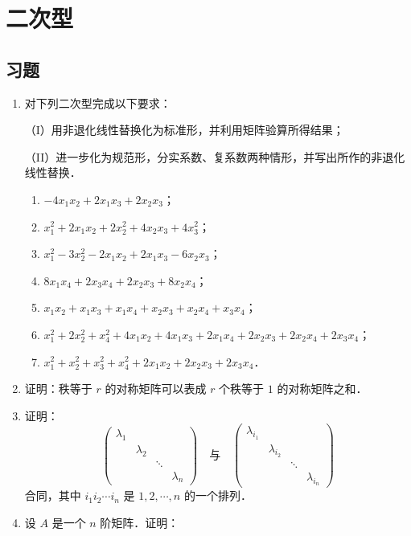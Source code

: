 \chapter{二次型}
\section{习题}
\begin{enumerate}
  \item 对下列二次型完成以下要求：\par
  （I）用非退化线性替换化为标准形，并利用矩阵验算所得结果；\par
  （II）进一步化为规范形，分实系数、复系数两种情形，并写出所作的非退化线性替换．
  \begin{enumerate}
    \item $-4x_1x_2+2x_1x_3+2x_2x_3$；
  \anssub
    \item $x_1^2+2x_1x_2+2x_2^2+4x_2x_3+4x_3^2$；
  \anssub
    \item $x_1^2-3x_2^2-2x_1x_2+2x_1x_3-6x_2x_3$；
  \anssub
    \item $8x_1x_4+2x_3x_4+2x_2x_3+8x_2x_4$；
  \anssub
    \item $x_1x_2+x_1x_3+x_1x_4+x_2x_3+x_2x_4+x_3x_4$；
  \anssub
    \item $x_1^2+2x_2^2+x_4^2+4x_1x_2+4x_1x_3+2x_1x_4+2x_2x_3+2x_2x_4+2x_3x_4$；
  \anssub
    \item $x_1^2+x_2^2+x_3^2+x_4^2+2x_1x_2+2x_2x_3+2x_3x_4$．
  \anssub
  \end{enumerate}
  \item 证明：秩等于 $r$ 的对称矩阵可以表成 $r$ 个秩等于 $1$ 的对称矩阵之和．
  \ansproof
  \item 证明：
  \[
    \begin{pmatrix}
      \lambda_1&&&\\
      &\lambda_2&&\\
      &&\ddots&\\
      &&&\lambda_n
    \end{pmatrix}
    \quad\text{与}\quad
    \begin{pmatrix}
      \lambda_{i_1}&&&\\
      &\lambda_{i_2}&&\\
      &&\ddots&\\
      &&&\lambda_{i_n}
    \end{pmatrix}
  \]
  合同，其中 $i_1i_2\cdots i_n$ 是 $1,2,\cdots,n$ 的一个排列．
  \ansproof
  \item 设 $A$ 是一个 $n$ 阶矩阵．证明：
  \begin{enumerate}

\end{enumerate}
\end{enumerate}
